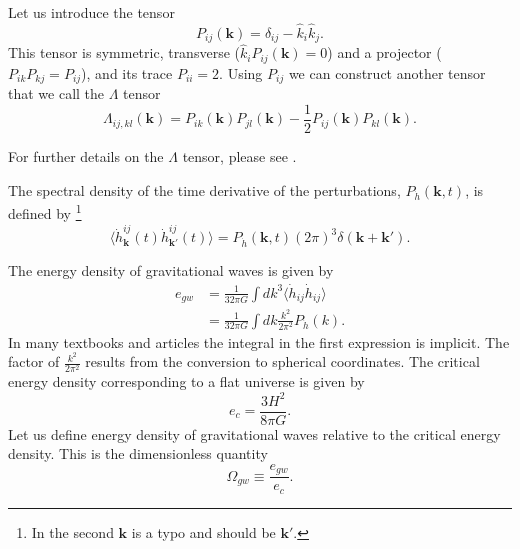 Let us introduce the tensor
\cite[eq. 1.35]{maggiore_gw_2008}
\begin{equation}
P_{ij}(\bm{k}) = \delta_{ij} - \hat{k}_i \hat{k}_j.
\end{equation}
This tensor is symmetric, transverse ($\hat{k}_i P_{ij}(\bm{k}) = 0$) and a projector ($P_{ik}P_{kj} = P_{ij}$), and its trace $P_{ii} = 2$.
Using $P_{ij}$ we can construct another tensor that we call the $\Lambda$ tensor
\cite[eq. 1.36]{maggiore_gw_2008}
\begin{equation}
\Lambda_{ij,kl}(\bm{k}) = P_{ik}(\bm{k}) P_{jl}(\bm{k}) - \frac{1}{2} P_{ij}(\bm{k}) P_{kl}(\bm{k}).
\label{eq:Lambda}
\end{equation}
\iffalse
This is still a projector, in the sense that
\begin{equation}
\Lambda_{ij,kl} \Lambda_{kl,mn} = \Lambda_{ij,mn}.
\end{equation}
It is also transverse on all of its indices as $n^i \Lambda_{ij,kl} = 0$ for all indices ($ijkl$}.
It is traceless with respect to the ($i,j$) and ($k,l$) index pairs,
\begin{equation}
\Lambda_{ii,kl} = \Lambda_{ij,kk} = 0.
\end{equation}
\fi
For further details on the $\Lambda$ tensor, please see
\cite[ch. 1.2]{maggiore_gw_2008}.

The spectral density of the time derivative of the perturbations, $P_{\dot{h}}(\bm{k},t)$, is defined by
\cite[eq. 3.4]{hindmarsh_gw_pt_2019}%
\footnote{In \cite[eq. 3.4]{hindmarsh_gw_pt_2019} the second $\mathbf{k}$ is a typo and should be $\mathbf{k}'$.}
\begin{equation}
\langle \dot{h}_{\bm{k}}^{ij}(t) \dot{h}_{\bm{k}'}^{ij}(t) \rangle = P_{\dot{h}}(\bm{k},t) (2\pi)^3 \delta (\bm{k} + \bm{k}').
\label{eq:hbracket}
\end{equation}

The energy density of gravitational waves is given by
\cites[eq. 3.3]{hindmarsh_gw_pt_2019}[eq. 1.135, 7.193]{maggiore_gw_2008}
\begin{align}
e_{gw}
&= \frac{1}{32 \pi G} \int dk^3 \langle \dot{h}_{ij} \dot{h}_{ij} \rangle \\
&= \frac{1}{32 \pi G} \int dk \frac{k^2}{2 \pi^2} P_{\dot{h}}(k).
\end{align}
In many textbooks and articles the integral in the first expression is implicit.
The factor of $\frac{k^2}{2\pi^2}$ results from the conversion to spherical coordinates.
The critical energy density corresponding to a flat universe is given by
\cite[eq. 7.196]{maggiore_gw_2008}
\begin{equation}
e_c = \frac{3 H^2}{8 \pi G}.
\label{eq:e_crit}
\end{equation}
Let us define energy density of gravitational waves relative to the critical energy density.
This is the dimensionless quantity
\begin{equation}
\Omega_{gw} \equiv \frac{e_{gw}}{e_c}.
\label{eq:omega_gw}
\end{equation}

